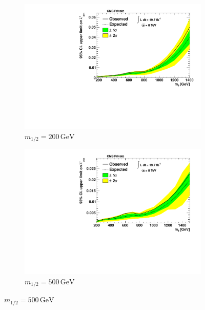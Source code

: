 \begin{figure}[!p]
  \centering
  \begin{subfigure}[b]{0.495\textwidth}
    \centering
    \includegraphics[width=\textwidth]{plots/limit_m12_200.pdf}
    \setlength{\abovecaptionskip}{-20pt}
    \setlength{\belowcaptionskip}{10pt}
    \caption{$m_{1/2} = 200\,\text{GeV}$\label{fig:limit-m12-200}}
  \end{subfigure}
  \begin{subfigure}[b]{0.495\textwidth}
    \centering
    \includegraphics[width=\textwidth]{plots/limit_m12_500.pdf}
    \setlength{\abovecaptionskip}{-20pt}
    \setlength{\belowcaptionskip}{10pt}
    \caption{$m_{1/2} = 500\,\text{GeV}$\label{fig:limit-m12-500}}
  \end{subfigure}


\end{figure}
